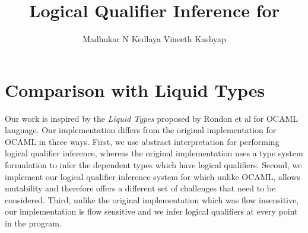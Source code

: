 \documentclass[9pt]{article}
\title{\textbf{Logical Qualifier Inference for \lang}}
\author{Madhukar N Kedlaya \andalso
		Vineeth Kashyap}
\date{}
\begin{document}
\maketitle















\section{Comparison with Liquid Types}
Our work is inspired by the \emph{Liquid Types} proposed by Rondon et al\cite{Rondon2008} for OCAML language. Our implementation differs from the original implementation for OCAML in three ways. First, we use abstract interpretation for performing logical qualifier inference, whereas the original implementation uses a type system formulation to infer the dependent types which have logical qualifiers. Second, we implement our logical qualifier inference system for \lang which unlike OCAML, \lang allows mutability and therefore offers a different set of challenges that need to be considered. Third, unlike the original implementation which was flow insensitive, our implementation is flow sensitive and we infer logical qualifiers at every point in the program.



{}

\end{document}
